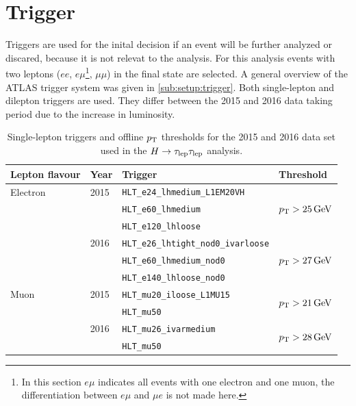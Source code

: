 \section{Trigger}\label{sec:event_selection:trigger}

Triggers are used for the inital decision if an event will be further analyzed or discared, because it is not relevat to the analysis.
For this analysis events with two leptons ($ee$, $e\mu$\footnote{In this section $e\mu$ indicates all events
with one electron and one muon, the differentiation between $e\mu$ and $\mu e$ is not made here.}, $\mu\mu$) in the final state are selected.
A general overview of the ATLAS trigger system was given in \cref{sub:setup:trigger}.
Both single-lepton and dilepton triggers are used.
They differ between the 2015 and 2016 data taking period due to the increase in luminosity.

\begin{table}[htpb]
    \centering
    \caption{Single-lepton triggers and offline $p_\text{T}$ thresholds for the 2015 and 2016 data set used in the $H \to \tau_\text{lep} \tau_\text{lep}$ analysis.}\label{tab:event_selection:trigger:single}
    \begin{tabular}{@{}llll@{}}
        \toprule
        Lepton flavour & Year & Trigger & Threshold \\ \midrule
        Electron       & 2015 & \texttt{HLT\_e24\_lhmedium\_L1EM20VH} & \multirow{3}{*}{$\pt > \unit[25]{GeV}$} \\
                       &      & \texttt{HLT\_e60\_lhmedium} \\
                       &      & \texttt{HLT\_e120\_lhloose} \\ \cmidrule(l){2-4}
                       & 2016 & \texttt{HLT\_e26\_lhtight\_nod0\_ivarloose} & \multirow{3}{*}{$\pt > \unit[27]{GeV}$} \\
                       &      & \texttt{HLT\_e60\_lhmedium\_nod0} \\
                       &      & \texttt{HLT\_e140\_lhloose\_nod0} \\ \midrule
        Muon           & 2015 & \texttt{HLT\_mu20\_iloose\_L1MU15} & \multirow{2}{*}{$\pt > \unit[21]{GeV}$} \\
                       &      & \texttt{HLT\_mu50} \\ \cmidrule(l){2-4}
                       & 2016 & \texttt{HLT\_mu26\_ivarmedium} & \multirow{2}{*}{$\pt > \unit[28]{GeV}$} \\
                       &      & \texttt{HLT\_mu50} \\
        \bottomrule
    \end{tabular}
\end{table}


